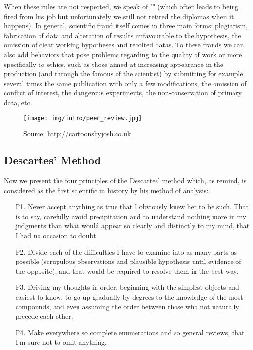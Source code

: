 When these rules are not respected, we speak of "" (which often leads to being fired from his job but unfortunately we still not retired the diplomas when it happens). In general, scientific fraud itself comes in three main forms: plagiarism, fabrication of data and alteration of results unfavourable to the hypothesis, the omission of clear working hypotheses and recolted datas. To these frauds we can also add behaviors that pose problems regarding to the quality of work or more specifically to ethics, such as those aimed at increasing appearance in the production (and through the famous of the scientist) by submitting for example several times the same publication with only a few modifications, the omission of conflict of interest, the dangerous experiments, the non-conservation of primary data, etc.
	\begin{figure}[H]
		\centering
		\texttt{[image: img/intro/peer\_review.jpg]}
		\caption[]{Source: \url{http://cartoonsbyjosh.co.uk}}
	\end{figure}	

	\subsection{Descartes' Method}
	Now we present the four principles of the Descartes' method which, as remind, is considered as the first scientific in history by his method of analysis:
	\begin{itemize}
	\item[P1.] Never accept anything as true that I obviously knew her to be such. That is to say, carefully avoid precipitation and to understand nothing more in my judgments than what would appear so clearly and distinctly to my mind, that I had no occasion to doubt.
	
	\item[P2.] Divide each of the difficulties I have to examine into as many parts as possible (scrupulous observations and plausible hypothesis until evidence of the opposite), and that would be required to resolve them in the best way.
	
	\item[P3.] Driving my thoughts in order, beginning with the simplest objects and easiest to know, to go up gradually by degrees to the knowledge of the most compounds, and even assuming the order between those who not naturally precede each other.
	
	\item[P4.] Make everywhere so complete enumerations and so general reviews, that I'm sure not to omit anything.
	\end{itemize}	

